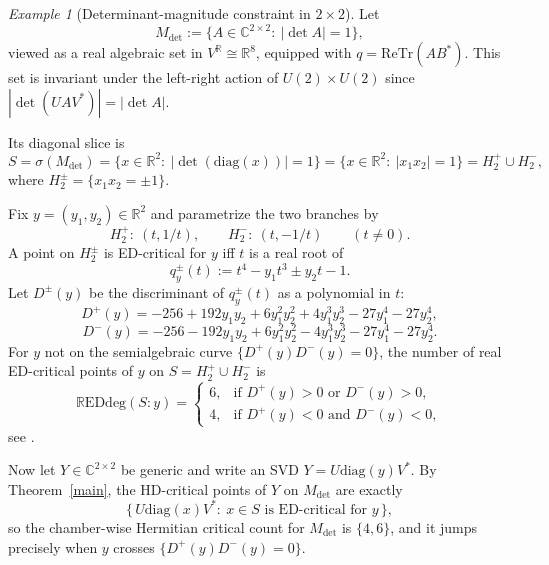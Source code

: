 \documentclass[11pt]{amsart}
\def\R{\mathbb R}\let\er\R
\def\C{\mathbb C}\let\ce\C
\theoremstyle{plain}
\theoremstyle{definition}
\theoremstyle{remark}
\newtheorem{example}[theorem]{Example}
\begin{document}
\begin{example}[Determinant-magnitude constraint in $2\times2$]\label{ex:det-mag-2x2}
Let
\[
M_{\det}:=\{A\in\C^{2\times2}:\ |\det A|=1\},
\]
viewed as a real algebraic set in $V^{\R}\cong\R^{8}$, equipped with
$q=\mathrm{ReTr}(AB^*)$.  This set is invariant under the left-right action of
$U(2)\times U(2)$ since $|\det(UAV^*)|=|\det A|$.

Its diagonal slice is
\[
S=\sigma(M_{\det})
=\{x\in\R^2:\ |\det(\mathrm{diag}(x))|=1\}
=\{x\in\R^2:\ |x_1x_2|=1\}
=H_2^+\cup H_2^-,
\]
where $H_2^{\pm}=\{x_1x_2=\pm1\}$.

Fix $y=(y_1,y_2)\in\R^2$ and parametrize the two branches by
\[
H_2^+:\ (t,1/t),\qquad H_2^-:\ (t,-1/t)\qquad (t\neq0).
\]
A point on $H_2^{\pm}$ is ED-critical for $y$ iff $t$ is a real root of
\[
q_y^{\pm}(t):=t^4-y_1t^3\pm y_2t-1.
\]
Let $D^{\pm}(y)$ be the discriminant of $q_y^{\pm}(t)$ as a polynomial in $t$:
\[
D^{+}(y)= -256 + 192y_1y_2 + 6y_1^2y_2^2 + 4y_1^3y_2^3 - 27y_1^4 - 27y_2^4,
\]
\[
D^{-}(y)= -256 - 192y_1y_2 + 6y_1^2y_2^2 - 4y_1^3y_2^3 - 27y_1^4 - 27y_2^4.
\]
For $y$ not on the semialgebraic curve $\{D^+(y)D^-(y)=0\}$, the number of real
ED-critical points of $y$ on $S=H_2^+\cup H_2^-$ is
\[
\mathrm{\mathbb{R}EDdeg}(S:y)=
\begin{cases}
6, & \text{if } D^+(y)>0 \text{ or } D^-(y)>0,\\
4, & \text{if } D^+(y)<0 \text{ and } D^-(y)<0,
\end{cases}
\]
see \cite[Example 4.4]{drusvyatskiyLeeThomas2015}.

Now let $Y\in\C^{2\times2}$ be generic and write an SVD $Y=U\mathrm{diag}(y)V^*$.
By Theorem~\ref{main}, the HD-critical points of $Y$ on $M_{\det}$ are exactly
\[
\{\,U\mathrm{diag}(x)V^*:\ x\in S \text{ is ED-critical for } y\,\},
\]
so the chamber-wise Hermitian critical count for $M_{\det}$ is $\{4,6\}$, and
it jumps precisely when $y$ crosses $\{D^+(y)D^-(y)=0\}$.
\end{example}
\end{document}
